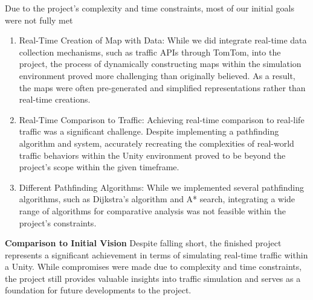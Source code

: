 Due to the project's complexity and time constraints, most of our initial goals were not fully met
\begin{enumerate}
	\item Real-Time Creation of Map with Data: While we did integrate real-time data collection mechanisms, such as traffic APIs through TomTom, into the project, the process of dynamically constructing maps within the simulation environment proved more challenging than originally believed. As a result, the maps were often pre-generated and simplified representations rather than real-time creations.
	\item Real-Time Comparison to Traffic: Achieving real-time comparison to real-life traffic was a significant challenge. Despite implementing a pathfinding algorithm and system, accurately recreating the complexities of real-world traffic behaviors within the Unity environment proved to be beyond the project's scope within the given timeframe.
	\item Different Pathfinding Algorithms: While we implemented several pathfinding algorithms, such as Dijkstra's algorithm and A* search, integrating a wide range of algorithms for comparative analysis was not feasible within the project's constraints.
\end{enumerate}
\textbf{Comparison to Initial Vision}
Despite falling short, the finished project represents a significant achievement in terms of simulating real-time traffic within a Unity. While compromises were made due to complexity and time constraints, the project still provides valuable insights into traffic simulation and serves as a foundation for future developments to the project.
